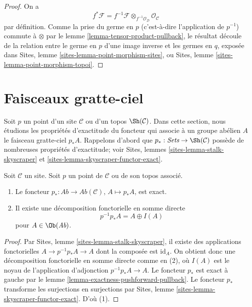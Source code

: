 \begin{proof}
On a
$$
f^*\mathcal{F} =
f^{-1}\mathcal{F} \otimes_{f^{-1}\mathcal{O}_\mathcal{D}}
\mathcal{O}_\mathcal{C}
$$
par définition. Comme la prise du germe en $p$ (c'est-à-dire l'application de
$p^{-1}$) commute à $\otimes$ par le
lemme \ref{lemma-tensor-product-pullback}, le résultat découle de la relation
entre le germe en $p$ d'une image inverse et les germes en $q$, exposée dans
Sites, lemme \ref{sites-lemma-point-morphism-sites}, ou
Sites, lemme \ref{sites-lemma-point-morphism-topoi}.
\end{proof}






\section{Faisceaux gratte-ciel}
\label{section-skyscraper}

\noindent
Soit $p$ un point d'un site $\mathcal{C}$ ou d'un topos
$\Sh(\mathcal{C})$. Dans cette section, nous étudions les propriétés
d'exactitude du foncteur qui associe à un groupe abélien $A$ le faisceau
gratte-ciel $p_*A$. Rappelons d'abord que
$p_* : \textit{Sets} \to \Sh(\mathcal{C})$ possède de nombreuses propriétés
d'exactitude; voir Sites, lemmes \ref{sites-lemma-stalk-skyscraper} et
\ref{sites-lemma-skyscraper-functor-exact}.

\begin{lemma}
\label{lemma-skyscraper-exact}
Soit $\mathcal{C}$ un site. Soit $p$ un point de $\mathcal{C}$ ou de son
topos associé.
\begin{enumerate}
\item Le foncteur $p_* : \textit{Ab} \to \textit{Ab}(\mathcal{C})$,
$A \mapsto p_*A$, est exact.
\item Il existe une décomposition fonctorielle en somme directe
$$
p^{-1}p_*A = A \oplus I(A)
$$
pour $A \in \Ob(\textit{Ab})$.
\end{enumerate}
\end{lemma}

\begin{proof}
Par Sites, lemme \ref{sites-lemma-stalk-skyscraper}, il existe des
applications fonctorielles $A \to p^{-1}p_*A \to A$ dont la composée est
$\text{id}_A$. On obtient donc une décomposition fonctorielle en somme directe
comme en (2), où $I(A)$ est le noyau de l'application d'adjonction
$p^{-1}p_*A \to A$. Le foncteur $p_*$ est exact à gauche par le
lemme \ref{lemma-exactness-pushforward-pullback}. Le foncteur $p_*$ transforme
les surjections en surjections par Sites,
lemme \ref{sites-lemma-skyscraper-functor-exact}. D'où (1).
\end{proof}

